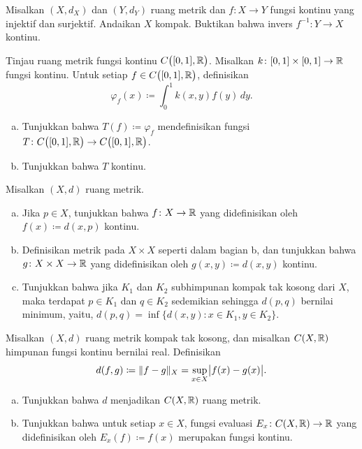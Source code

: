 \begin{exercise}
Misalkan $(X,d_X)$ dan $(Y,d_Y)$ ruang metrik dan
$f \colon X \to Y$ fungsi kontinu yang injektif dan surjektif.  Andaikan
$X$ kompak.  Buktikan bahwa invers $f^{-1} \colon Y \to X$
kontinu.
\end{exercise}

\begin{exercise}
Tinjau ruang metrik fungsi kontinu $C\bigl([0,1],{\mathbb{R}}\bigr)$.  Misalkan
$k \colon [0,1] \times [0,1] \to {\mathbb{R}}$ fungsi kontinu.
Untuk setiap $f \in C\bigl([0,1],{\mathbb{R}}\bigr)$, definisikan
\begin{equation*}
\varphi_f(x) \coloneqq \int_0^1 k(x,y) f(y) \,dy .
\end{equation*}
\begin{enumerate}[a)]
\item
Tunjukkan bahwa $T(f) \coloneqq \varphi_f$ mendefinisikan fungsi
$T \colon C\bigl([0,1],{\mathbb{R}}\bigr) \to C\bigl([0,1],{\mathbb{R}}\bigr)$.
\item
Tunjukkan bahwa $T$ kontinu.
\end{enumerate}
\end{exercise}

\begin{samepage}
\begin{exercise}
Misalkan $(X,d)$ ruang metrik.
\begin{enumerate}[a)]
\item
Jika $p \in X$,
tunjukkan bahwa $f \colon X \to {\mathbb{R}}$ yang didefinisikan
oleh $f(x) \coloneqq d(x,p)$ kontinu.
\item
Definisikan metrik pada $X \times X$ seperti dalam  bagian
b, dan tunjukkan bahwa $g \colon X \times X \to {\mathbb{R}}$ yang didefinisikan oleh
$g(x,y) \coloneqq d(x,y)$ kontinu.
\item
Tunjukkan bahwa jika $K_1$ dan $K_2$ subhimpunan kompak tak kosong dari $X$, maka
terdapat $p \in K_1$ dan $q \in K_2$ sedemikian sehingga $d(p,q)$ bernilai minimum,
yaitu, $d(p,q) = \inf \{ d(x,y) \colon x \in K_1, y \in K_2 \}$.
\end{enumerate}
\end{exercise}
\end{samepage}

\begin{exercise}
Misalkan $(X,d)$ ruang metrik kompak tak kosong, dan misalkan $C(X,{\mathbb{R}})$ himpunan
fungsi kontinu bernilai real.  Definisikan
\begin{equation*}
d(f,g) \coloneqq \lVert {f-g} \rVert_X = \sup_{x \in X} \bigl\lvert {f(x)-g(x)} \bigr\rvert .
\end{equation*}
\begin{enumerate}[a)]
\item
Tunjukkan bahwa $d$ menjadikan $C(X,{\mathbb{R}})$ ruang metrik.
\item
Tunjukkan bahwa untuk setiap $x \in X$, fungsi evaluasi
$E_x \colon C(X,{\mathbb{R}}) \to {\mathbb{R}}$ yang didefinisikan oleh $E_x(f) \coloneqq f(x)$
merupakan fungsi kontinu.
\end{enumerate}
\end{exercise}

